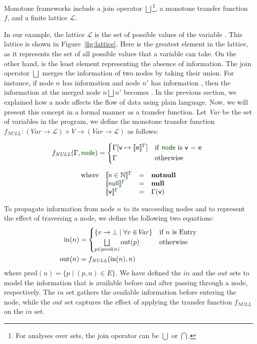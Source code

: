 Monotone frameworks include a join operator $\bigsqcup$\footnote{
  For analyses over sets, the join operator can be $\bigcup$ or $\bigcap$.
}, a monotone transfer function $f$,
and a finite lattice $\mathcal{L}$.

In our example, the lattice $\mathcal{L}$ is the set of possible values of the variable . 
This lattice is shown in Figure~\ref{fig:lattice}. Here  is
the greatest element in the lattice, as it represents the set of all possible values
that a variable can take. On the other hand,  is the least element
representing the absence of information.
The join operator $\bigsqcup$ merges the information of two nodes by taking their
union. For instance, if node $n$ has information  and node $n'$ has 
information , then the information at the merged node $n \bigsqcup n'$ 
becomes . 
In the previous section, we explained how a node affects the flow of data 
using plain language. Now, we will present this concept in a formal manner 
as a transfer function. Let \textit{Var} be the set of variables in the program, we define
the monotone transfer function $f_{\textit{NULL}}: (\textit{Var} \rightarrow \mathcal{L}) \times V \rightarrow (\textit{Var} \rightarrow \mathcal{L})$
as follows:

\[ 
  f_{\textit{NULL}}(\Gamma, \vterminal{node}) = 
  \begin{cases*}
  \Gamma[\vmetavar{v} \mapsto \semNPA{\vmetavar{e}}^\Gamma] & if  \vterminal{node} is \vterminal{\vmetavar{v} = \vmetavar{e}}  \\
  \Gamma  & otherwise
\end{cases*} \]%

\[
\begin{array}{llcl}
\textrm{where}&\semNPA{\vterminal{n}\in \mathbb{N}}^\Gamma			&=& \textbf{notnull}\\
&\semNPA{\vterminal{null}}^\Gamma			&=& \textbf{null}\\
&\semNPA{\vmetavar{v}}^\Gamma				&=& \Gamma(\vmetavar{v})\\
\end{array}
\]


To propagate information from node $n$ to its succeeding nodes and to represent the 
effect of traversing a node, we define the following two equations:
\begin{align*}
  \text{in}(n) &= \begin{cases} \{ v \rightarrow \bot \mid \forall v \in $\textit{Var}$ \} & $if $ n $ is Entry$ \\ \bigsqcup\limits_{p \in \text{pred}(n)} \text{out}(p) & $otherwise$ \end{cases} \\
  \text{out}(n) &= f_{\mathit{NULL}}(\text{in}(n),n)
\end{align*}
where $\text{pred}(n) = \{ p \mid (p,n)\in E\}$.
We have defined the $in$ and the $out$ sets to model the information that is available 
before and after passing through a node, respectively. The $in$ set gathers the available 
information before entering the node, while the $out$ set captures the effect 
of applying the transfer function $f_{\textit{NULL}}$ on the $in$ set.

